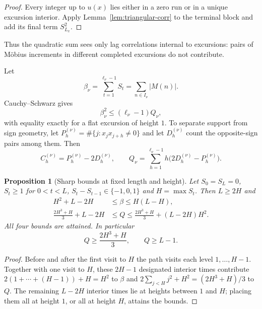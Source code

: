 \documentclass[11pt]{amsart}
\numberwithin{equation}{section}
\theoremstyle{plain}
\newtheorem{proposition}[theorem]{Proposition}
\theoremstyle{definition}
\theoremstyle{remark}
\begin{document}
\begin{proof}
Every integer up to $u(x)$ lies either in a zero run or in a unique excursion
interior. Apply Lemma~\ref{lem:triangular-corr} to the terminal block and
add its final term $S_{L_x}^2$.
\end{proof}

Thus the quadratic sum sees only lag correlations internal to excursions:
pairs of M\"obius increments in different completed excursions do not
contribute.

Let
\begin{equation}
\label{eq:beta_def}
\beta_\nu=\sum_{t=1}^{\ell_\nu-1}S_t=\sum_{n\in I_\nu}|M(n)|.
\end{equation}
Cauchy--Schwarz gives
\begin{equation}
\label{eq:beta-Q}
\beta_\nu^2\le(\ell_\nu-1)Q_\nu,
\end{equation}
with equality exactly for a flat excursion of height $1$. To separate
support from sign geometry, let $P_h^{(\nu)}=\#\{j:x_jx_{j+h}\ne0\}$ and let
$D_h^{(\nu)}$ count the opposite-sign pairs among them. Then
\begin{equation}
\label{eq:C-P-D}
C_h^{(\nu)}=P_h^{(\nu)}-2D_h^{(\nu)},\qquad
Q_\nu=\sum_{h=1}^{\ell_\nu-1}h\bigl(2D_h^{(\nu)}-P_h^{(\nu)}\bigr).
\end{equation}

\begin{proposition}[Sharp bounds at fixed length and height]
\label{prop:sharp-LH}
Let $S_0=S_L=0$, $S_t\ge1$ for $0<t<L$, $S_t-S_{t-1}\in\{-1,0,1\}$ and
$H=\max S_t$. Then $L\ge2H$ and
\begin{align}
H^2+L-2H&\le\beta\le H(L-H),\label{eq:beta-LH}\\
\frac{2H^3+H}{3}+L-2H&\le Q\le
\frac{2H^3+H}{3}+(L-2H)H^2.\label{eq:Q-LH}
\end{align}
All four bounds are attained. In particular
\begin{equation}
\label{eq:height_Q_min}
Q\ge\frac{2H^3+H}{3},\qquad Q\ge L-1.
\end{equation}
\end{proposition}

\begin{proof}
Before and after the first visit to $H$ the path visits each level
$1,\dots,H-1$. Together with one visit to $H$, these $2H-1$ designated
interior times contribute $2(1+\cdots+(H-1))+H=H^2$ to $\beta$ and
$2\sum_{j<H}j^2+H^2=(2H^3+H)/3$ to $Q$. The remaining $L-2H$ interior times
lie at heights between $1$ and $H$; placing them all at height $1$, or all
at height $H$, attains the bounds.
\end{proof}
\end{document}
